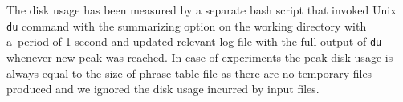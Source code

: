 The disk usage has been measured by a separate bash script that invoked Unix
\texttt{du} command with the summarizing option on the working directory with
a~period of 1 second and updated relevant log file with the full output of
\texttt{du} whenever new peak was reached.
In case of \eppex{} experiments the peak disk usage is always equal to the
size of phrase table file as there are no temporary files produced and we
ignored the disk usage incurred by input files.
